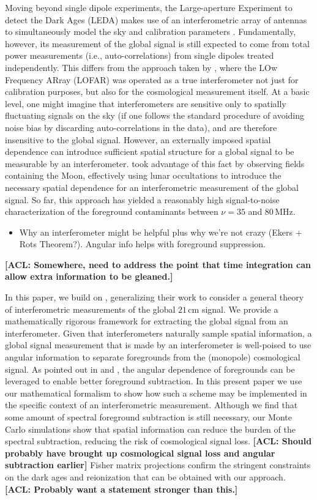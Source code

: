 \documentclass[twolcolumn,apj,iop,numberedappendix]{emulateapj}
\newcommand{\acl}[1]{{\color{red} \textbf{[ACL:  #1]}}}
\begin{document}
Moving beyond single dipole experiments, the Large-aperture Experiment to detect the Dark Ages (LEDA) makes use of an interferometric array of antennas to simultaneously model the sky and calibration parameters \citep{BernardiLEDA}.  Fundamentally, however, its measurement of the global signal is still expected to come from total power measurements (i.e., auto-correlations) from single dipoles treated independently.  This differs from the approach taken by \citet{VedanthamLOFAR2}, where the LOw Frequency ARray (LOFAR) was operated as a true interferometer not just for calibration purposes, but also for the cosmological measurement itself.  At a basic level, one might imagine that interferometers are sensitive only to spatially fluctuating signals on the sky (if one follows the standard procedure of avoiding noise bias by discarding auto-correlations in the data), and are therefore insensitive to the global signal.  However, an externally imposed spatial dependence can introduce sufficient spatial structure for a global signal to be measurable by an interferometer.  \citet{VedanthamLOFAR2} took advantage of this fact by observing fields containing the Moon, effectively using lunar occultations to introduce the necessary spatial dependence for an interferometric measurement of the global signal.  So far, this approach has yielded a reasonably high signal-to-noise characterization of the foreground contaminants between $\nu =35$ and $80\,\textrm{MHz}$.

\begin{itemize}
\item Why an interferometer might be helpful plus why we're not crazy (Ekers + Rots Theorem?).  Angular info helps with foreground suppression.
\end{itemize}
\acl{Somewhere, need to address the point that time integration can allow extra information to be gleaned.}

In this paper, we build on \citet{VedanthamLOFAR2}, generalizing their work to consider a general theory of interferometric measurements of the global $21\,\textrm{cm}$ signal.  We provide a mathematically rigorous framework for extracting the global signal from an interferometer.  Given that interferometers naturally sample spatial information, a global signal measurement that is made by an interferometer is well-poised to use angular information to separate foregrounds from the (monopole) cosmological signal.  As pointed out in \citep{L13} and \citep{Liu_Switzer_2014}, the angular dependence of foregrounds can be leveraged to enable better foreground subtraction.  In this present paper we use our mathematical formalism to show how such a scheme may be implemented in the specific context of an interferometric measurement.  Although we find that some amount of spectral foreground subtraction is still necessary, our Monte Carlo simulations show that spatial information can reduce the burden of the spectral subtraction, reducing the risk of cosmological signal loss.  \acl{Should probably have brought up cosmological signal loss and angular subtraction earlier}  Fisher matrix projections confirm the stringent constraints on the dark ages and reionization that can be obtained with our approach.  \acl{Probably want a statement stronger than this.}
\end{document}
